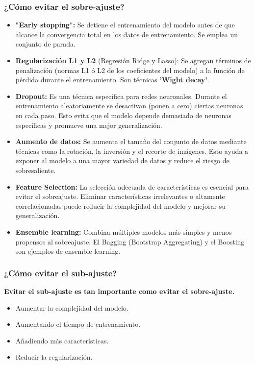 \subsubsection*{¿Cómo evitar el \textbf{sobre}-ajuste?}
\begin{itemize}
	\item \textbf{"Early stopping":} Se detiene el entrenamiento del modelo antes de que alcance la convergencia total en los datos de entrenamiento. Se emplea un conjunto de parada.
	\item \textbf{Regularización L1 y L2} (Regresión Ridge y Lasso): Se agregan términos de penalización (normas L1 ó L2 de los coeficientes del modelo) a la función de pérdida durante el entrenamiento. Son técnicas \textbf{'Wight decay'}.
	\item \textbf{Dropout:} Es una técnica específica para redes neuronales. Durante el entrenamiento aleatoriamente se desactivan (ponen a cero) ciertas neuronas en cada paso. Esto evita que el modelo depende demasiado de neuronas específicas y promueve una mejor generalización.
	\item \textbf{Aumento de datos:} Se aumenta el tamaño del conjunto de datos mediante técnicas como la rotación, la inversión y el recorte de imágenes. Esto ayuda a exponer al modelo a una mayor variedad de datos y reduce el riesgo de sobresaliente.
	\item \textbf{Feature Selection:} La selección adecuada de características es esencial para evitar el sobreajuste. Eliminar características irrelevantes o altamente correlacionadas puede reducir la complejidad del modelo y mejorar su generalización.
	\item \textbf{Ensemble learning:} Combina múltiples modelos más simples y menos propensos al sobreajuste. El Bagging (Bootstrap Aggregating) y el Boosting son ejemplos de ensemble learning.
\end{itemize}
\subsubsection*{¿Cómo evitar el \textbf{sub}-ajuste?}
\textbf{Evitar el sub-ajuste es tan importante como evitar el sobre-ajuste.}
\begin{itemize}
	\item Aumentar la complejidad del modelo.
	\item Aumentando el tiempo de entrenamiento.
	\item Añadiendo más características.
	\item Reducir la regularización.
\end{itemize}
